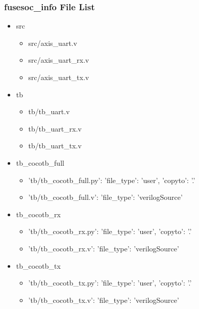 \subsubsection{fusesoc\_info File List}
\begin{itemize}
\item src
	\begin{itemize}
	\item src/axis\_uart.v
	\item src/axis\_uart\_rx.v
	\item src/axis\_uart\_tx.v
	\end{itemize}
\item tb
	\begin{itemize}
	\item tb/tb\_uart.v
	\item tb/tb\_uart\_rx.v
	\item tb/tb\_uart\_tx.v
	\end{itemize}
\item tb\_cocotb\_full
	\begin{itemize}
	\item {'tb/tb\_cocotb\_full.py': {'file\_type': 'user', 'copyto': '.'}}
	\item {'tb/tb\_cocotb\_full.v': {'file\_type': 'verilogSource'}}
	\end{itemize}
\item tb\_cocotb\_rx
	\begin{itemize}
	\item {'tb/tb\_cocotb\_rx.py': {'file\_type': 'user', 'copyto': '.'}}
	\item {'tb/tb\_cocotb\_rx.v': {'file\_type': 'verilogSource'}}
	\end{itemize}
\item tb\_cocotb\_tx
	\begin{itemize}
	\item {'tb/tb\_cocotb\_tx.py': {'file\_type': 'user', 'copyto': '.'}}
	\item {'tb/tb\_cocotb\_tx.v': {'file\_type': 'verilogSource'}}
	\end{itemize}
\end{itemize}
